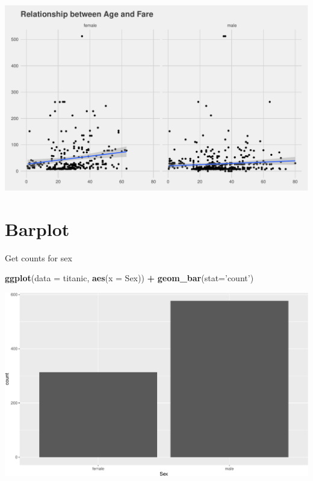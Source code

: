 \documentclass[
]{book}
\newenvironment{Shaded}{\begin{snugshade}}{\end{snugshade}}
\newcommand{\DataTypeTok}[1]{\textcolor[rgb]{0.13,0.29,0.53}{#1}}
\newcommand{\KeywordTok}[1]{\textcolor[rgb]{0.13,0.29,0.53}{\textbf{#1}}}
\newcommand{\NormalTok}[1]{#1}
\newcommand{\OperatorTok}[1]{\textcolor[rgb]{0.81,0.36,0.00}{\textbf{#1}}}
\newcommand{\StringTok}[1]{\textcolor[rgb]{0.31,0.60,0.02}{#1}}
\begin{document}
\includegraphics{figures/unnamed-chunk-140-1.pdf}

\hypertarget{barplot}{%
\section*{Barplot}\label{barplot}}

Get counts for sex

\begin{Shaded}
\begin{Highlighting}[]
\KeywordTok{ggplot}\NormalTok{(}\DataTypeTok{data =}\NormalTok{ titanic, }\KeywordTok{aes}\NormalTok{(}\DataTypeTok{x =}\NormalTok{ Sex)) }\OperatorTok{+}\StringTok{ }\KeywordTok{geom_bar}\NormalTok{(}\DataTypeTok{stat=}\StringTok{'count'}\NormalTok{)}
\end{Highlighting}
\end{Shaded}

\includegraphics{figures/unnamed-chunk-141-1.pdf}
\end{document}
